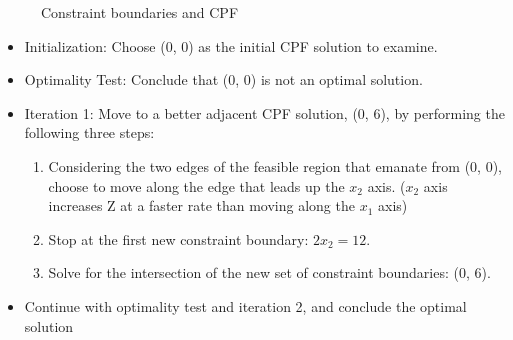 \documentclass[12pt]{article}
\begin{document}
  \begin{figure}[h]
    \centering
{}
    \caption{Constraint boundaries and CPF}
  \end{figure}


  \begin{itemize}
  \item Initialization: Choose (0, 0) as the initial CPF solution to examine. 
  \item Optimality Test: Conclude that (0, 0) is not an optimal solution. 
  \item Iteration 1: Move to a better adjacent CPF solution, (0, 6), by performing the following three steps:
    \begin{enumerate}
    \item Considering the two edges of the feasible region that emanate from (0, 0), choose to move
along the edge that leads up the $x_2$ axis. ($x_2$ axis increases Z at a faster rate than moving along the $x_1$ axis)
\item Stop at the first new constraint boundary: $2x_2 = 12$. 
\item Solve for the intersection of the new set of constraint boundaries: (0, 6). 
    \end{enumerate}
\item Continue with optimality test and iteration 2, and conclude the optimal solution
  \end{itemize}
\end{document}
